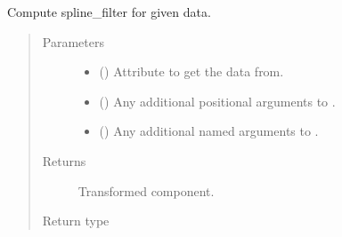 \documentclass[letterpaper,10pt,english]{sphinxmanual}
\begin{document}
\begin{fulllineitems}
\begin{fulllineitems}
\label{\detokenize{api/rock:geology.src.Rock.spline_filter}}
Compute spline\_filter for given data.
\begin{quote}\begin{description}
\item[{Parameters}] \leavevmode\begin{itemize}
\item {} 
 (\sphinxstyleliteralemphasis{\sphinxupquote{, }}) \textendash{} Attribute to get the data from.

\item {} 
 () \textendash{} Any additional positional arguments to .

\item {} 
 () \textendash{} Any additional named arguments to .

\end{itemize}

\item[{Returns}] \leavevmode
{} \textendash{} Transformed component.

\item[{Return type}] \leavevmode
{\hyperref[\detokenize{api/base_classes:geology.src.base_spatial.SpatialComponent}]{}}

\end{description}\end{quote}

\end{fulllineitems}



\end{fulllineitems}
\end{document}
